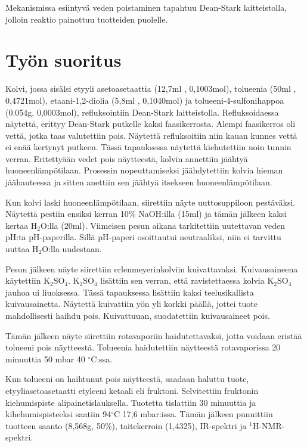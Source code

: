 \documentclass[11pt,a4paper]{article}
\begin{document}
\vspace{0.3cm}

\noindent Mekanismissa esiintyvä veden poistaminen tapahtuu Dean-Stark laitteistolla, jolloin reaktio painottuu tuotteiden puolelle. 

\section{Työn suoritus}

Kolvi, jossa sisälsi etyyli asetoasetaattia (12,7ml , 0,1003mol), tolueenia (50ml , 0,4721mol), etaani-1,2-diolia (5,8ml , 0,1040mol) ja tolueeni-4-sulfonihappoa (0.054g, 0,0003mol), refluksointiin Dean-Stark laitteistolla. Refluksoidaessa näytettä, erittyy Dean-Stark putkelle kaksi faasikerrosta. Alempi faasikerros oli vettä, jotka taas valutettiin pois. Näytettä refluksoitiin niin kauan kunnes vettä ei enää kertynyt putkeen. Tässä tapauksessa näytettä kiehutettiin noin tunnin verran. Eritettyään vedet pois näytteestä, kolvin annettiin jäähtyä huoneenlämpötilaan. Prosessin nopeuttamiseksi jäähdytettiin kolvia hieman jäähauteessa ja sitten anettiin sen jäähtyä itsekseen huoneenlämpötilaan. 

Kun kolvi laski huoneenlämpötilaan, siirettiin näyte uuttosuppiloon pestäväksi. Näytettä pestiin ensiksi kerran 10$\%$ NaOH:illa (15ml) ja tämän jälkeen kaksi kertaa H$_2$O:lla (20ml). Viimeisen pesun aikana tarkitettiin uutettavan veden pH:ta pH-paperilla. Sillä pH-paperi osoittautui neutraaliksi, niin ei tarvittu uuttaa H$_2$O:lla uudestaan. 

Pesun jälkeen näyte siirettiin erlenmeyerinkolviin kuivattavaksi. Kuivausaineena käytettiin K$_2$SO$_4$. K$_2$SO$_4$ lisättiin sen verran, että ravistettaessa kolvia K$_2$SO$_4$ jauhoa ui liuoksessa. Tässä tapauksessa lisättiin kaksi teelusikallista kuivausainetta. Näytettä kuivattiin yön yli korkki päällä, jottei tuote mahdollisesti haihdu pois. Kuivattuuan, suodatettiin kuivausaineet pois. 

Tämän jälkeen näyte siirettiin rotavaporiin haidutettavaksi, jotta voidaan eristää tolueeni pois näytteestä. Tolueenia haidutettiin näytteestä rotavaporissa 20 minuuttia 50 mbar 40 $^\circ$C:ssa. 


Kun tolueeni on haihtunut pois näytteestä, saadaan haluttu tuote, etyyliasetoasetaatti etyleeni ketaali eli fruktoni. Selvitettiin fruktonin kiehumispiste alipainetislauksella. Tuotetta tislattiin 30 minuuttia ja kihehumispisteeksi saatiin 94$^\circ$C 17,6 mbar:issa. Tämän jälkeen punnittiin tuotteen saanto (8,568g, 50$\%$), taitekerroin (1,4325), IR-spektri ja $^1$H-NMR-spektri.
\end{document}
